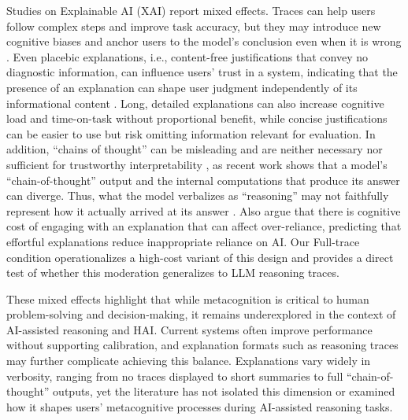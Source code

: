 \documentclass[acmlarge,review=true, anonymous=true]{acmart}
\begin{document}
Studies on Explainable AI (XAI) report mixed effects. Traces can help users follow complex steps and improve task accuracy, but they may introduce new cognitive biases \cite{bertrand2022cognitive} and anchor users to the model's conclusion even when it is wrong \cite{10.1145/3397481.3450639}. Even placebic explanations, i.e., content-free justifications that convey no diagnostic information, can influence users' trust in a system, indicating that the presence of an explanation can shape user judgment independently of its informational content \cite{eiband2019impact}. Long, detailed explanations can also increase cognitive load and time-on-task without proportional benefit, while concise justifications can be easier to use but risk omitting information relevant for evaluation. In addition, ``chains of thought'' can be misleading and are neither necessary nor sufficient for trustworthy interpretability \cite{barez2025chain}, as recent work shows that a model's ``chain-of-thought'' output and the internal computations that produce its answer can diverge. Thus, what the model verbalizes as ``reasoning'' may not faithfully represent how it actually arrived at its answer \cite{lindsey2025biology, 10.5555/3666122.3669397}. Also \citet{vasconcelos2023explanations}argue that there is cognitive cost of engaging with an explanation that can affect over-reliance, predicting that effortful explanations reduce inappropriate reliance on AI. Our Full-trace condition operationalizes a high-cost variant of this design and provides a direct test of whether this moderation generalizes to LLM reasoning traces.

These mixed effects highlight that while metacognition is critical to human problem-solving and decision-making, it remains underexplored in the context of AI-assisted reasoning and HAI. Current systems often improve performance without supporting calibration, and explanation formats such as reasoning traces may further complicate achieving this balance. Explanations vary widely in verbosity, ranging from no traces displayed to short summaries to full ``chain-of-thought'' outputs, yet the literature has not isolated this dimension or examined how it shapes users' metacognitive processes during AI-assisted reasoning tasks.
\end{document}
